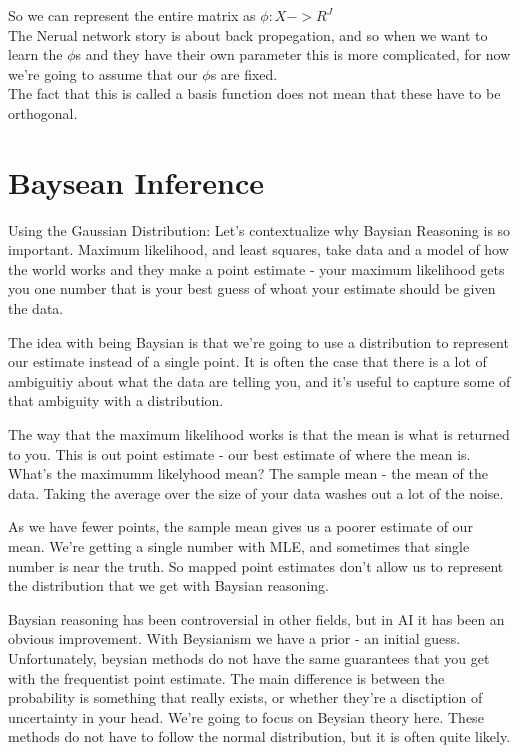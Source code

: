 \documentclass[12pt]{article}   	%
\begin{document}
\noindent
So we can represent the entire matrix as $\phi:X -> R^{J}$\\

\noindent
The Nerual network story is about back propegation, and so when we want to learn the $\phi$s and they have their own parameter this is more complicated, for now we're going to assume that our $\phi$s are fixed.\\

The fact that this is called a basis function does not mean that these have to be orthogonal.

\section{Baysean Inference}

\indent
Using the Gaussian Distribution: 
Let's contextualize why Baysian Reasoning is so important. Maximum likelihood, and least squares, take data and a model of how the world works and they make a point estimate - your maximum likelihood gets you one number that is your best guess of whoat your estimate should be given the data. 

The idea with being Baysian is that we're going to use a distribution to represent our estimate instead of a single point. It is often the case that there is a lot of ambiguitiy about what the data are telling you, and it's useful to capture some of that ambiguity with a distribution. 

The way that the maximum likelihood works is that the mean is what is returned to you. This is out point estimate - our best estimate of where the mean is. What's the maximumm likelyhood mean? The sample mean - the mean of the data. Taking the average over the size of your data washes out a lot of the noise. 

As we have fewer points, the sample mean gives us a poorer estimate of our mean. We're getting a single number with MLE, and sometimes that single number is near the truth. So mapped point estimates don't allow us to represent the distribution that we get with Baysian reasoning. 

Baysian reasoning has been controversial in other fields, but in AI it has been an obvious improvement. With Beysianism we have a prior - an initial guess. Unfortunately, beysian methods do not have the same guarantees that you get with the frequentist point estimate. The main difference is between the probability is something that really exists, or whether they're a disctiption of uncertainty in your head. We're going to focus on Beysian theory here. These methods do not have to follow the normal distribution, but it is often quite likely. \\\\
\end{document}
